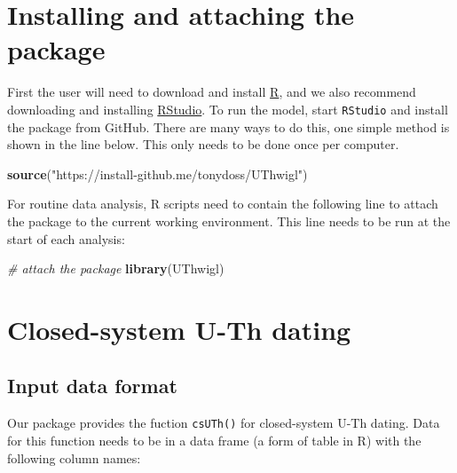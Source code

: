 \documentclass[]{elsarticle} %
\newenvironment{Shaded}{\begin{snugshade}}{\end{snugshade}}
\newcommand{\CommentTok}[1]{\textcolor[rgb]{0.56,0.35,0.01}{\textit{#1}}}
\newcommand{\KeywordTok}[1]{\textcolor[rgb]{0.13,0.29,0.53}{\textbf{#1}}}
\newcommand{\NormalTok}[1]{#1}
\newcommand{\StringTok}[1]{\textcolor[rgb]{0.31,0.60,0.02}{#1}}
\begin{document}
\hypertarget{installing-and-attaching-the-package}{%
\section{Installing and attaching the package}\label{installing-and-attaching-the-package}}

First the user will need to download and install \href{https://www.r-project.org/}{R}, and we also recommend downloading and installing \href{https://www.rstudio.com/}{RStudio}. To run the model, start \texttt{RStudio} and install the package from GitHub. There are many ways to do this, one simple method is shown in the line below. This only needs to be done once per computer.

\begin{Shaded}
\begin{Highlighting}[]
\KeywordTok{source}\NormalTok{(}\StringTok{"https://install{-}github.me/tonydoss/UThwigl"}\NormalTok{)}
\end{Highlighting}
\end{Shaded}

For routine data analysis, R scripts need to contain the following line to attach the package to the current working environment. This line needs to be run at the start of each analysis:

\begin{Shaded}
\begin{Highlighting}[]
\CommentTok{\# attach the package}
\KeywordTok{library}\NormalTok{(UThwigl)}
\end{Highlighting}
\end{Shaded}

\newpage

\hypertarget{closed-system-u-th-dating}{%
\section{Closed-system U-Th dating}\label{closed-system-u-th-dating}}

\hypertarget{input-data-format}{%
\subsection{Input data format}\label{input-data-format}}

Our package provides the fuction \texttt{csUTh()} for closed-system U-Th dating. Data for this function needs to be in a data frame (a form of table in R) with the following column names:
\end{document}
